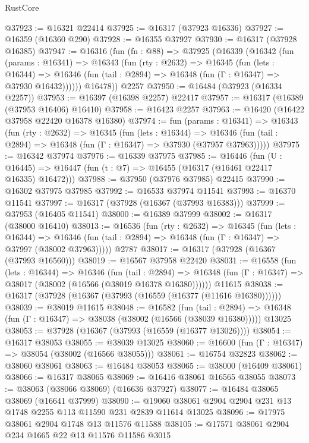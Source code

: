 \begin{lexlean}{RustCore}
\begin{coremodule}
@37923 := @16321 @22414
@37925 := @16317 (@37923 @16336)
@37927 := @16359 (@16360 @290)
@37928 := @16355 @37927
@37930 := @16317 (@37928 @16385)
@37947 := @16316
    (fun (fn : @88) =>
    @37925
      (@16339
        (@16342
          (fun (params : @16341) =>
          @16343
            (fun (rty : @2632) =>
            @16345
              (fun (lets : @16344) =>
              @16346 (fun (tail : @2894) => @16348 (fun (Γ : @16347) => @37930 @16432))))))
        @16478))
    @2257
@37950 := @16484 (@37923 (@16334 @2257))
@37953 := @16397 (@16398 @2257) @22417
@37957 := @16317 (@16389 (@37953 @16406) @16410)
@37958 := @16423 @2257
@37963 := @16420 (@16422 @37958 @22420 @16378 @16380)
@37974 := fun (params : @16341) =>
  @16343
    (fun (rty : @2632) =>
    @16345
      (fun (lets : @16344) =>
      @16346 (fun (tail : @2894) => @16348 (fun (Γ : @16347) => @37930 (@37957 @37963)))))
@37975 := @16342 @37974
@37976 := @16339 @37975
@37985 := @16446
    (fun (U : @16445) => @16447 (fun (t : @7) => @16455 (@16317 (@16461 @22417 @16335) @16472)))
@37988 := @37950 (@37976 @37985) @22415
@37990 := @16302 @37975 @37985
@37992 := @16533 @37974 @11541
@37993 := @16370 @11541
@37997 := @16317 (@37928 (@16367 (@37993 @16383)))
@37999 := @37953 (@16405 @11541)
@38000 := @16389 @37999
@38002 := @16317 (@38000 @16410)
@38013 := @16536
    (fun (rty : @2632) =>
    @16345
      (fun (lets : @16344) =>
      @16346 (fun (tail : @2894) => @16348 (fun (Γ : @16347) => @37997 (@38002 @37963)))))
    @2787
@38017 := @16317 (@37928 (@16367 (@37993 @16560)))
@38019 := @16567 @37958 @22420
@38031 := @16558
    (fun (lets : @16344) =>
    @16346
      (fun (tail : @2894) =>
      @16348 (fun (Γ : @16347) => @38017 (@38002 (@16566 (@38019 @16378 @16380))))))
    @11615
@38038 := @16317 (@37928 (@16367 (@37993 (@16559 (@16377 (@11616 @16380))))))
@38039 := @38019 @11615
@38048 := @16582
    (fun (tail : @2894) => @16348 (fun (Γ : @16347) => @38038 (@38002 (@16566 (@38039 @16380)))))
    @13025
@38053 := @37928 (@16367 (@37993 (@16559 (@16377 @13026))))
@38054 := @16317 @38053
@38055 := @38039 @13025
@38060 := @16600 (fun (Γ : @16347) => @38054 (@38002 (@16566 @38055)))
@38061 := @16754 @32823
@38062 := @38060 @38061
@38063 := @16484 @38053
@38065 := @38000 (@16409 @38061)
@38066 := @16317 @38065
@38069 := @16416 @38061 @16565 @38055
@38073 := @38063 (@38066 @38069) (@16636 @37927)
@38077 := @16484 @38065 @38069 (@16641 @37999)
@38090 := @19060 @38061 @2904 @2904 @231 @13 @1748 @2255 @113 @11590 @231 @2839 @11614 @13025
@38096 := @17975 @38061 @2904 @1748 @13 @11576 @11588
@38105 := @17571 @38061 @2904 @234 @1665 @22 @13 @11576 @11586 @3015

\end{coremodule}
\end{lexlean}
